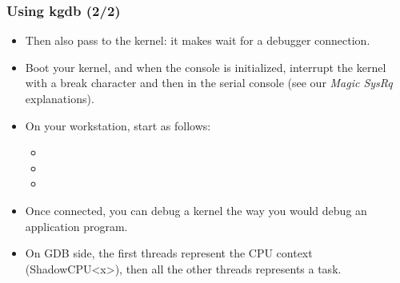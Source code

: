 \begin{frame}
  \frametitle{Using kgdb (2/2)}
  \begin{itemize}
  \item Then also pass  to the kernel: it makes
     wait for a debugger connection.
  \item Boot your kernel, and when the console is initialized,
    interrupt the kernel with a break character and then 
    in the serial console (see our {\em Magic SysRq} explanations).
  \item On your workstation, start  as follows:
    \begin{itemize}
    \item {}
    \item {}
    \item {}
    \end{itemize}
  \item Once connected, you can debug a kernel the way you would debug
    an application program.
  \item On GDB side, the first threads represent the CPU context (ShadowCPU<x>),
    then all the other threads represents a task.
  \end{itemize}
\end{frame}
